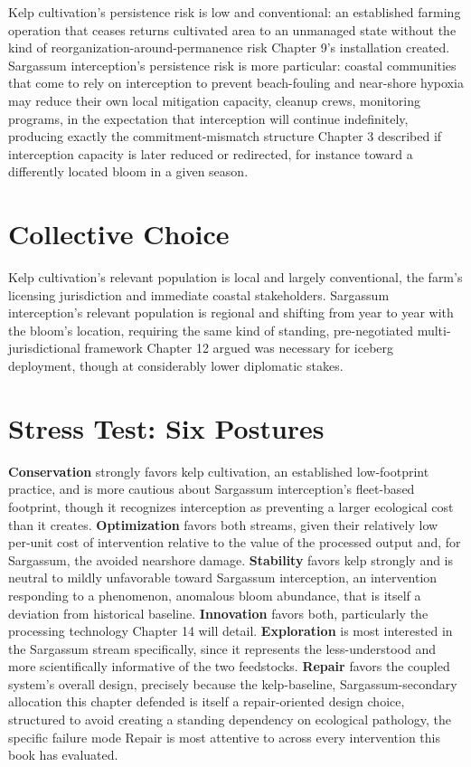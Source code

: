 \documentclass[11pt,oneside]{book}
\begin{document}
Kelp cultivation's persistence risk is low and conventional: an established farming operation that ceases returns cultivated area to an unmanaged state without the kind of reorganization-around-permanence risk Chapter 9's installation created. Sargassum interception's persistence risk is more particular: coastal communities that come to rely on interception to prevent beach-fouling and near-shore hypoxia may reduce their own local mitigation capacity, cleanup crews, monitoring programs, in the expectation that interception will continue indefinitely, producing exactly the commitment-mismatch structure Chapter 3 described if interception capacity is later reduced or redirected, for instance toward a differently located bloom in a given season.

\section*{Collective Choice}

Kelp cultivation's relevant population is local and largely conventional, the farm's licensing jurisdiction and immediate coastal stakeholders. Sargassum interception's relevant population is regional and shifting from year to year with the bloom's location, requiring the same kind of standing, pre-negotiated multi-jurisdictional framework Chapter 12 argued was necessary for iceberg deployment, though at considerably lower diplomatic stakes.

\section*{Stress Test: Six Postures}

\textbf{Conservation} strongly favors kelp cultivation, an established low-footprint practice, and is more cautious about Sargassum interception's fleet-based footprint, though it recognizes interception as preventing a larger ecological cost than it creates. \textbf{Optimization} favors both streams, given their relatively low per-unit cost of intervention relative to the value of the processed output and, for Sargassum, the avoided nearshore damage. \textbf{Stability} favors kelp strongly and is neutral to mildly unfavorable toward Sargassum interception, an intervention responding to a phenomenon, anomalous bloom abundance, that is itself a deviation from historical baseline. \textbf{Innovation} favors both, particularly the processing technology Chapter 14 will detail. \textbf{Exploration} is most interested in the Sargassum stream specifically, since it represents the less-understood and more scientifically informative of the two feedstocks. \textbf{Repair} favors the coupled system's overall design, precisely because the kelp-baseline, Sargassum-secondary allocation this chapter defended is itself a repair-oriented design choice, structured to avoid creating a standing dependency on ecological pathology, the specific failure mode Repair is most attentive to across every intervention this book has evaluated.
\end{document}
